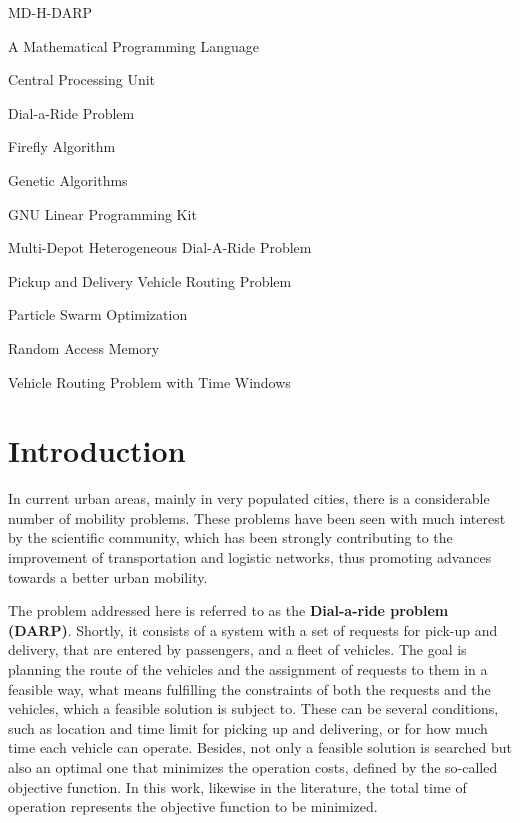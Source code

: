 \documentclass[tuberlin,cic,tc,openright,english,noabntcite,oneside]{iiufrgs}
\begin{document}
\begin{listofabbrv}{MD-H-DARP}
	\item[AMPL] A Mathematical Programming Language
	\item[CPU] Central Processing Unit
    \item[DARP] Dial-a-Ride Problem
    \item[FA] Firefly Algorithm
    \item[GA] Genetic Algorithms
    \item[GLPK] GNU Linear Programming Kit
    \item[MD-H-DARP] Multi-Depot Heterogeneous Dial-A-Ride Problem
    \item[PDVRP] Pickup and Delivery Vehicle Routing Problem
    \item[PSO] Particle Swarm Optimization
    \item[RAM] Random Access Memory
    \item[VRPTW] Vehicle Routing Problem with Time Windows
\end{listofabbrv}


\tableofcontents


\chapter{Introduction}
In current urban areas, mainly in very populated cities, there is a considerable number of mobility problems. These problems have been seen with much interest by the scientific community, which has been strongly contributing to the improvement of transportation and logistic networks, thus promoting advances towards a better urban mobility.

The problem addressed here is referred to as the \textbf{Dial-a-ride problem (DARP)}. Shortly, it consists of a system with a set of requests for pick-up and delivery, that are entered by passengers, and a fleet of vehicles. The goal is planning the route of the vehicles and the assignment of requests to them in a feasible way, what means fulfilling the constraints of both the requests and the vehicles, which a feasible solution is subject to. These can be several conditions, such as location and time limit for picking up and delivering, or for how much time each vehicle can operate. Besides, not only a feasible solution is searched but also an optimal one that minimizes the operation costs, defined by the so-called objective function. In this work, likewise in the literature, the total time of operation represents the objective function to be minimized.
\end{document}
